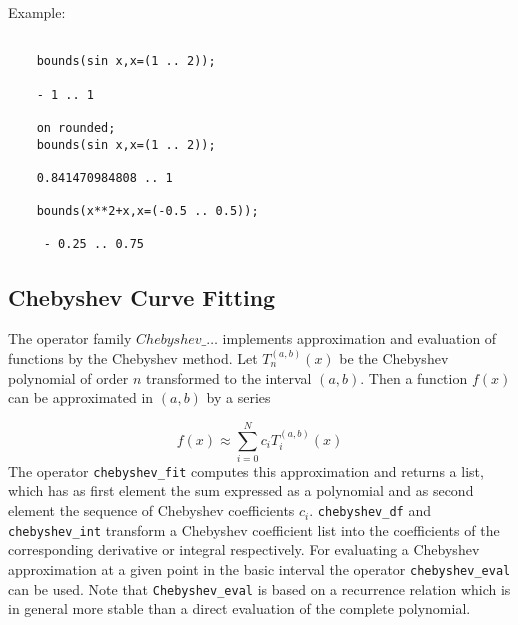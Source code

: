 Example:

\begin{verbatim}

    bounds(sin x,x=(1 .. 2));

    - 1 .. 1

    on rounded;
    bounds(sin x,x=(1 .. 2));

    0.841470984808 .. 1

    bounds(x**2+x,x=(-0.5 .. 0.5));

     - 0.25 .. 0.75

\end{verbatim}

\subsection{Chebyshev Curve Fitting}
\hypertarget{operator:CHEBYSHEV_FIT}{}
\hypertarget{operator:CHEBYSHEV_EVAL}{}
\hypertarget{operator:CHEBYSHEV_DF}{}
\hypertarget{operator:CHEBYSHEV_INT}{}

The operator family $Chebyshev\_\ldots$ implements approximation
and evaluation of functions by the Chebyshev method.
Let $T_n^{(a,b)}(x)$ be the Chebyshev polynomial of order $n$
transformed to the interval $(a,b)$. Then a function $f(x)$ can be
approximated in $(a,b)$ by a series

\begin{displaymath}
 f(x) \approx \sum_{i=0}^N c_i T_i^{(a,b)}(x) 
\end{displaymath}
The operator \texttt{chebyshev\_fit} computes this approximation and
returns a list, which has as first element the sum expressed
as a polynomial and as second element the sequence
of Chebyshev coefficients $c_{i}$.
\texttt{chebyshev\_df} and \texttt{chebyshev\_int} transform a Chebyshev
coefficient list into the coefficients of the corresponding
derivative or integral respectively. For evaluating a Chebyshev
approximation at a given point in the basic interval the
operator \texttt{chebyshev\_eval} can be used. Note that
\texttt{Chebyshev\_eval} is based on a recurrence relation which is
in general more stable than a direct evaluation of the
complete polynomial.


